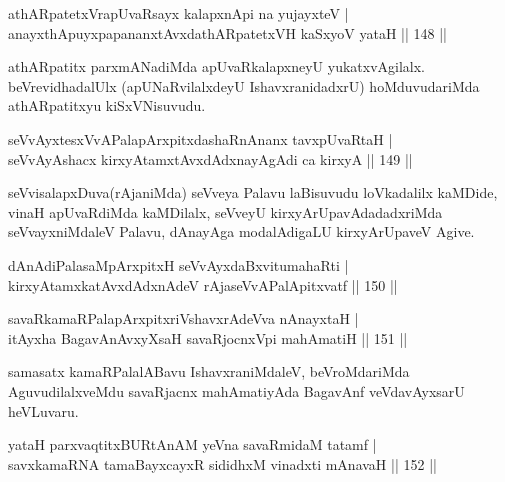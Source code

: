 \begin{shl}
athARpatetxVrapUvaRsayx kalapxnA\s pi na yujayxteV |\\
anayxthA\s puyxpapananxtAvxdathARpatetxVH kaSxyoV yataH \hfill || 148 ||
\end{shl}

\begin{artha}
athARpatitx parxmANadiMda apUvaRkalapxneyU yukatxvAgilalx. beVrevidhadalUlx (apUNaRvilalxdeyU IshavxranidadxrU) hoMduvudariMda athARpatitxyu kiSxVNisuvudu.
\end{artha}

\begin{shl}
seVvAyxtesxVvAPalapArxpitxdashaRnAnanx tavxpUvaRtaH |\\
seVvAyAshacx kirxyAtamxtAvxdAdxnayAgAdi ca kirxyA \hfill || 149 ||
\end{shl}

\begin{artha}
seVvisalapxDuva(rAjaniMda) seVveya Palavu laBisuvudu loVkadalilx kaMDide, vinaH apUvaRdiMda kaMDilalx, seVveyU kirxyArUpavAdadadxriMda seVvayxniMdaleV Palavu, dAnayAga modalAdigaLU kirxyArUpaveV Agive.
\end{artha}


\begin{shl}
dAnAdiPalasaMpArxpitxH seVvAyxdaBxvitumahaRti |\\
kirxyAtamxkatAvxdAdxnAdeV rAjaseVvAPalApitxvatf \hfill || 150 ||
\end{shl}

\begin{shl}
savaRkamaRPalapArxpitxriVshavxrAdeVva nAnayxtaH |\\
itAyxha BagavAnAvxyXsaH savaRjocnxV\s pi mahAmatiH \hfill || 151 ||
\end{shl}

\begin{artha}%
samasatx kamaRPalalABavu IshavxraniMdaleV, beVroMdariMda AguvudilalxveMdu savaRjacnx mahAmatiyAda BagavAnf veVdavAyxsarU heVLuvaru.
\end{artha}


\begin{shl}
yataH parxvaqtitxBURtAnAM yeVna savaRmidaM tatamf |\\
savxkamaRNA tamaBayxcayxR sididhxM vinadxti mAnavaH \hfill || 152 ||
\end{shl}

